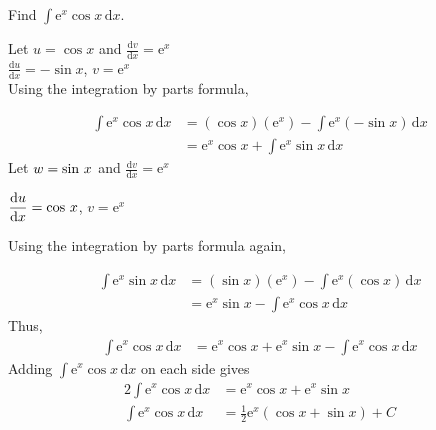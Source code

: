\documentclass[11pt,a4paper]{book}
\begin{document}
\newpage

\begin{example}

Find  ${\displaystyle \int \mathrm{e}^{x}\cos x\, \mathrm{d}x}$.

\medskip

\Solution

Let $u=\cos x$ and ${\displaystyle \frac{\mathrm{d}v}{\mathrm{d}x}=\mathrm{e}^{x}}$\\
\hphantom{}\hspace{0.26cm} ${\displaystyle \frac{\mathrm{d}u}{\mathrm{d}x}=-\sin x}$,
\hspace{0.44cm} ${\displaystyle v=\mathrm{e}^{x}}$\\

Using the integration by parts formula,

\medskip

\begin{align*}
{\displaystyle \int \mathrm{e}^{x}\cos x\, \mathrm{d}x} & =\left(\cos x\right)\left(\mathrm{e}^{x}\right)-\int \mathrm{e}^{x}\left(-\sin x\right)\, \mathrm{d}x\\
 & =\mathrm{e}^{x}\cos x+\int \mathrm{e}^{x}\sin x\, \mathrm{d}x
\end{align*}
Let $w=\sin\thinspace x$ and ${\displaystyle \frac{\mathrm{d}v}{\mathrm{d}x}=\mathrm{e}^{x}}$

\hspace{0.26cm} ${\displaystyle \frac{\mathrm{d}u}{\mathrm{d}x}=\cos\thinspace x}$,
\hspace{0.71cm} ${\displaystyle v=\mathrm{e}^{x}}$

\medskip

Using the integration by parts formula again,

\medskip

\begin{align*}
\int \mathrm{e}^{x}\sin x\, \mathrm{d}x & =\left(\sin x\right)\left(\mathrm{e}^{x}\right)-\int \mathrm{e}^{x}\left(\cos x\right)\, \mathrm{d}x\\
 & =\mathrm{e}^{x}\sin x-\int \mathrm{e}^{x}\cos x\, \mathrm{d}x
\end{align*}
Thus,
\begin{align*}
{\displaystyle \int \mathrm{e}^{x}\cos x\, \mathrm{d}x} & =\mathrm{e}^{x}\cos x+\mathrm{e}^{x}\sin x-\int \mathrm{e}^{x}\cos x\, \mathrm{d}x
\end{align*}
Adding ${\displaystyle \int \mathrm{e}^{x}\cos x\, \mathrm{d}x}$ on each side
gives
\begin{align*}
{\displaystyle 2\int \mathrm{e}^{x}\cos x\, \mathrm{d}x} & =\mathrm{e}^{x}\cos x+\mathrm{e}^{x}\sin x\\
\int \mathrm{e}^{x}\cos x\, \mathrm{d}x & =\frac{1}{2}\mathrm{e}^{x}\left(\cos x+\sin x\right)+C
\end{align*}

\end{example}
\end{document}
